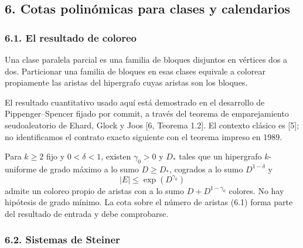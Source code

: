 \documentclass[spanish,11pt,a4paper]{article}
\begin{document}
\subsection{6. Cotas polinómicas para clases y calendarios}\label{cotas-polinuxf3micas-para-clases-y-calendarios}


\subsubsection{6.1. El resultado de coloreo}\label{el-resultado-de-coloreo}

Una clase paralela parcial es una familia de bloques disjuntos en vértices dos a dos. Particionar una familia de bloques en esas clases equivale a colorear propiamente las aristas del hipergrafo cuyas aristas son los bloques.

El resultado cuantitativo usado aquí está demostrado en el desarrollo de Pippenger--Spencer fijado por commit, a través del teorema de emparejamiento seudoaleatorio de Ehard, Glock y Joos {[}6, Teorema 1.2{]}. El contexto clásico es {[}5{]}; no identificamos el contrato exacto siguiente con el teorema impreso en 1989.

Para \(k\ge2\) fijo y \(0<\delta<1\), existen \(\gamma_0>0\) y \(D_*\) tales que un hipergrafo \(k\)-uniforme de grado máximo a lo sumo \(D\ge D_*\), cogrados a lo sumo \(D^{1-\delta}\) y \[|E|\le\exp(D^{\gamma_0})
\tag{6.1}\] admite un coloreo propio de aristas con a lo sumo \(D+D^{1-\gamma_0}\) colores. No hay hipótesis de grado mínimo. La cota sobre el número de aristas (6.1) forma parte del resultado de entrada y debe comprobarse.


\subsubsection{6.2. Sistemas de Steiner}\label{sistemas-de-steiner}
\end{document}
